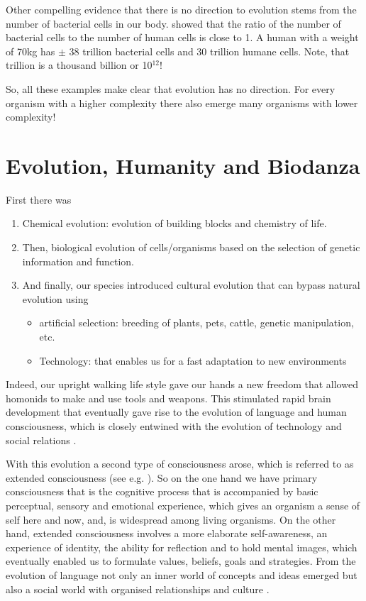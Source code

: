 \documentclass[
  11pt,
]{book}
\providecommand{\tightlist}{%
  \setlength{\itemsep}{0pt}\setlength{\parskip}{0pt}}
\begin{document}
Other compelling evidence that there is no direction to evolution stems from the number of bacterial cells in our body. \citet{Sender2016} showed that the ratio of the number of bacterial cells to the number of human cells is close to 1. A human with a weight of 70kg has \(\pm\) 38 trillion bacterial cells and 30 trillion humane cells. Note, that trillion is a thousand billion or 10\(^{12}\)!

So, all these examples make clear that evolution has no direction. For every organism with a higher complexity there also emerge many organisms with lower complexity!

\hypertarget{evolution-humanity-and-biodanza}{%
\section{Evolution, Humanity and Biodanza}\label{evolution-humanity-and-biodanza}}

First there was

\begin{enumerate}
\def\labelenumi{\arabic{enumi}.}
\item
  Chemical evolution: evolution of building blocks and chemistry of life.
\item
  Then, biological evolution of cells/organisms based on the selection of genetic information and function.
\item
  And finally, our species introduced cultural evolution that can bypass natural evolution using

  \begin{itemize}
  \tightlist
  \item
    artificial selection: breeding of plants, pets, cattle, genetic manipulation, etc.
  \item
    Technology: that enables us for a fast adaptation to new environments
  \end{itemize}
\end{enumerate}

Indeed, our upright walking life style gave our hands a new freedom that allowed homonids to make and use tools and weapons. This stimulated rapid brain development that eventually gave rise to the evolution of language and human consciousness, which is closely entwined with the evolution of technology and social relations \citep{capraLuisi2014}.

With this evolution a second type of consciousness arose, which is referred to as extended consciousness (see e.g. \citet{capraLuisi2014}). So on the one hand we have primary consciousness that is the cognitive process that is accompanied by basic perceptual, sensory and emotional experience, which gives an organism a sense of self here and now, and, is widespread among living organisms. On the other hand, extended consciousness involves a more elaborate self-awareness, an experience of identity, the ability for reflection and to hold mental images, which eventually enabled us to formulate values, beliefs, goals and strategies. From the evolution of language not only an inner world of concepts and ideas emerged but also a social world with organised relationships and culture \citep{capraLuisi2014}.
\end{document}

